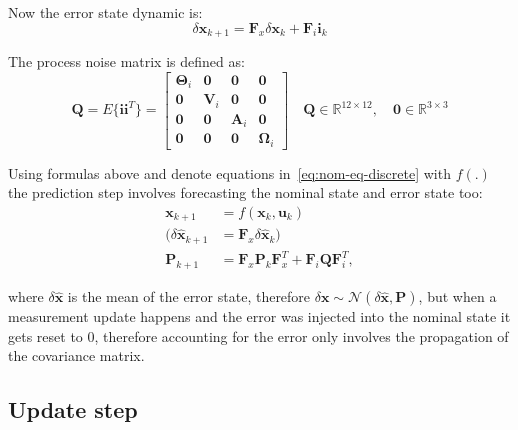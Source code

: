 Now the error state dynamic is:
\begin{equation}
    \delta\mathbf{x}_{k+1}=\mathbf{F}_x\delta\mathbf{x}_k+\mathbf{F}_{i}\mathbf{i}_k
    \label{eq:error-state-dyn}
\end{equation}

The process noise matrix is defined as:
\begin{equation}
    \mathbf{Q}=E\{\mathbf{i}\mathbf{i}^T\}=\begin{bmatrix}
        \boldsymbol{\Theta}_i & \mathbf{0} & \mathbf{0} & \mathbf{0} \\
        \mathbf{0} & \mathbf{V}_i & \mathbf{0} & \mathbf{0} \\
        \mathbf{0} & \mathbf{0} & \mathbf{A}_i & \mathbf{0} \\
        \mathbf{0} & \mathbf{0} & \mathbf{0} & \boldsymbol{\Omega}_i
    \end{bmatrix} \quad \mathbf{Q}\in\mathbb{R}^{12\times 12},\quad \mathbf{0}\in\mathbb{R}^{3\times 3}
\end{equation}

Using formulas above and denote equations in~\eqref{eq:nom-eq-discrete} with $f(.)$ the prediction step involves forecasting the nominal state and error state too:
\begin{subequations}
\begin{align}
    \mathbf{x}_{k+1} &= f(\mathbf{x}_k, \mathbf{u}_k) \\
    (\delta\hat{\mathbf{x}}_{k+1} &= \mathbf{F}_x\delta\hat{\mathbf{x}}_k) \label{eq:err-state-dyn}\\
    \mathbf{P}_{k+1} &= \mathbf{F}_x\mathbf{P}_k\mathbf{F}_x^T+ \mathbf{F}_i\mathbf{Q}\mathbf{F}_i^T,
    \label{eq:err-cov-prop}
\end{align}
\end{subequations}

where $\delta\hat{\mathbf{x}}$ is the mean of the error state, therefore $\delta\mathbf{x}\sim\mathcal{N}(\delta\hat{\mathbf{x}},\mathbf{P})$, but when a measurement update happens and the error was injected into the nominal state it gets reset to 0, therefore accounting for the error only involves the propagation of the covariance matrix.

\subsection{Update step}

